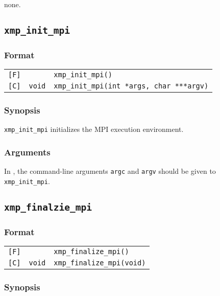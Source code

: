 none.

\subsection{\tt xmp\_init\_mpi}

\subsubsection*{Format}

\begin{tabular}{lll}
\verb![F]!&  {\tt }& {\tt xmp\_init\_mpi()}\\

\verb![C]!&  {\tt void}& {\tt xmp\_init\_mpi(int *args, char ***argv)}
\end{tabular}

\subsubsection*{Synopsis}

   {\tt xmp\_init\_mpi} initializes the MPI execution environment.

\subsubsection*{Arguments}

   In {\XMPC}, the command-line arguments {\tt argc} and {\tt argv}
   should be given to {\tt xmp\_init\_mpi}.


\subsection{\tt xmp\_finalzie\_mpi}

\subsubsection*{Format}

\begin{tabular}{lll}
\verb![F]!&  {\tt }& {\tt xmp\_finalize\_mpi()}\\

\verb![C]!&  {\tt void}& {\tt xmp\_finalize\_mpi(void)}
\end{tabular}

\subsubsection*{Synopsis}


